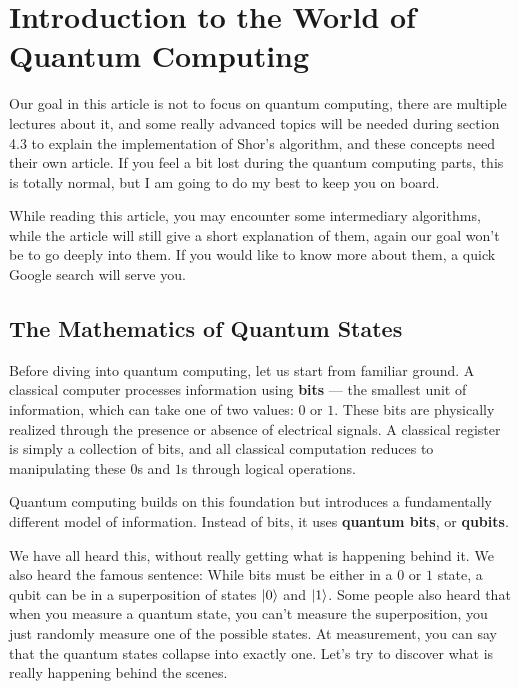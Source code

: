 \section{Introduction to the World of Quantum Computing}

\begin{smjnote}
Our goal in this article is not to focus on quantum computing, there are
multiple lectures about it, and some really advanced topics will be needed
during section 4.3 to explain the implementation of Shor's algorithm, and
these concepts need their own article. If you feel a bit lost during the
quantum computing parts, this is totally normal, but I am going to do my best
to keep you on board.
\end{smjnote}

\begin{smjnote}
While reading this article, you may encounter some intermediary algorithms,
while the article will still give a short explanation of them, again our goal
won't be to go deeply into them. If you would like to know more about them,
a quick Google search will serve you.
\end{smjnote}

\subsection{The Mathematics of Quantum States}

Before diving into quantum computing, let us start from familiar ground. A
classical computer processes information using \textbf{bits} --- the smallest
unit of information, which can take one of two values: $0$ or $1$. These bits
are physically realized through the presence or absence of electrical signals.
A classical register is simply a collection of bits, and all classical
computation reduces to manipulating these $0$s and $1$s through logical
operations.

Quantum computing builds on this foundation but introduces a fundamentally
different model of information. Instead of bits, it uses \textbf{quantum
bits}, or \textbf{qubits}.

We have all heard this, without really getting what is happening behind it.
We also heard the famous sentence: While bits must be either in a $0$ or $1$
state, a qubit can be in a superposition of states $\ket{0}$ and $\ket{1}$.
Some people also heard that when you measure a quantum state, you can't
measure the superposition, you just randomly measure one of the possible
states. At measurement, you can say that the quantum states collapse into
exactly one. Let's try to discover what is really happening behind the scenes.

